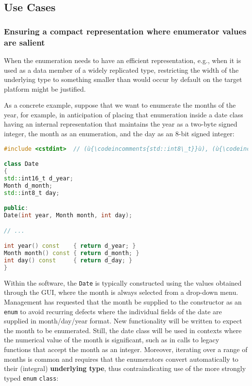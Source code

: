 \subsection[Use Cases]{Use Cases}\label{use-cases}

\subsubsection[Ensuring a compact representation where enumerator values are salient]{Ensuring a compact representation where enumerator values are salient}\label{ensuring-a-compact-representation-where-enumerator-values-are-salient}

When the enumeration needs to have an efficient representation, e.g.,
when it is used as a data member of a widely replicated type,
restricting the width of the underlying type to something smaller than
would occur by default on the target platform might be justified.

As a concrete example, suppose that we want to enumerate the months of
the year, for example, in anticipation of placing that enumeration
inside a date class having an internal representation that maintains the
year as a two-byte signed integer, the month as an enumeration, and the
day as an 8-bit signed integer:

\begin{lstlisting}[language=C++]
#include <cstdint>  // (ù{\codeincomments{std::int8\_t}}ù), (ù{\codeincomments{std::int16\_t}}ù)

class Date
{
std::int16_t d_year;
Month d_month;
std::int8_t day;

public:
Date(int year, Month month, int day);

// ...

int year() const    { return d_year; }
Month month() const { return d_month; }
int day() const     { return d_day; }
}
\end{lstlisting}

\noindent Within the software, the \texttt{Date} is typically constructed using
the values obtained through the GUI, where the month is always selected
from a drop-down menu. Management has requested that the month be
supplied to the constructor as an \texttt{enum} to avoid recurring
defects where the individual fields of the date are supplied in
month/day/year format. New functionality will be written to expect the
month to be enumerated. Still, the date class will be used in contexts
where the numerical value of the month is significant, such as in calls
to legacy functions that accept the month as an integer. Moreover,
iterating over a range of months is common and requires that the
enumerators convert automatically to their (integral) \textbf{underlying
type}, thus contraindicating use of the more strongly typed
\texttt{enum} \texttt{class}:

